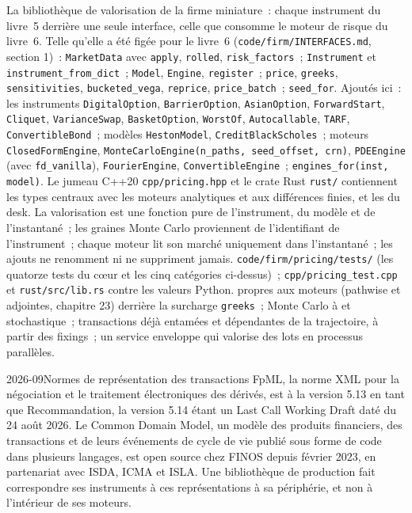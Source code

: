 \begin{build}
 La bibliothèque de valorisation de la firme miniature~: chaque instrument du livre~5 derrière une seule interface, celle que consomme le moteur de risque du livre~6.
 Telle qu'elle a été figée pour le livre~6 (\texttt{code/firm/INTERFACES.md}, section 1)~: \texttt{MarketData} avec \texttt{apply},
\texttt{rolled}, \texttt{risk\_factors}~; \texttt{Instrument} et \texttt{instrument\_from\_dict}~; \texttt{Model}, \texttt{Engine}, \texttt{register}~; \texttt{price},
\texttt{greeks}, \texttt{sensitivities}, \texttt{bucketed\_vega}, \texttt{reprice}, \texttt{price\_batch}~; \texttt{seed\_for}. Ajoutés ici~: les instruments
\texttt{DigitalOption}, \texttt{BarrierOption}, \texttt{AsianOption}, \texttt{ForwardStart}, \texttt{Cliquet}, \texttt{VarianceSwap}, \texttt{BasketOption},
\texttt{WorstOf}, \texttt{Autocallable}, \texttt{TARF}, \texttt{ConvertibleBond}~; modèles \texttt{HestonModel}, \texttt{CreditBlackScholes}~; moteurs
\texttt{ClosedFormEngine}, \texttt{MonteCarloEngine(n\_paths, seed\_offset, crn)}, \texttt{PDEEngine} (avec \texttt{fd\_vanilla}), \texttt{FourierEngine},
\texttt{ConvertibleEngine}~; \texttt{engines\_for(inst, model)}. Le jumeau C++20 \texttt{cpp/pricing.hpp} et le crate Rust \texttt{rust/} contiennent les types centraux
avec les moteurs analytiques et aux différences finies, et les  du desk.
 La valorisation est une fonction pure de l'instrument, du modèle et de l'instantané~; les graines Monte Carlo proviennent de l'identifiant de l'instrument~; chaque moteur lit son
marché uniquement dans l'instantané~; les ajouts ne renomment ni ne suppriment jamais.
 \texttt{code/firm/pricing/tests/} (les quatorze tests du cœur et les cinq catégories ci-dessus)~; \texttt{cpp/pricing\_test.cpp} et
\texttt{rust/src/lib.rs} contre les valeurs Python.
  propres aux moteurs (pathwise et adjointes, chapitre 23) derrière la surcharge \texttt{greeks}~; Monte Carlo à  et stochastique~; transactions
déjà entamées et dépendantes de la trajectoire, à partir des fixings~; un service enveloppe qui valorise des lots en processus parallèles.
\end{build}

\begin{dated}{2026-09}{Normes de représentation des transactions}\label{dat:dv:build-a-pricing-library:standards}
FpML, la norme XML pour la négociation et le traitement électroniques des dérivés, est à la version 5.13 en tant que Recommandation, la version 5.14 étant un Last Call Working Draft
daté du 24 août 2026. Le Common Domain Model, un modèle des produits financiers, des transactions et de leurs événements de cycle de vie publié sous forme de code dans plusieurs langages, est open source
chez FINOS depuis février 2023, en partenariat avec ISDA, ICMA et ISLA. Une bibliothèque de production fait correspondre ses instruments à ces représentations à sa périphérie,
et non à l'intérieur de ses moteurs.
\end{dated}

